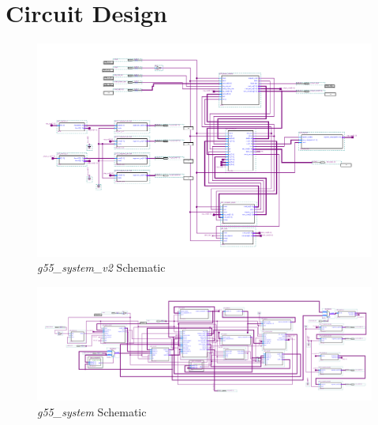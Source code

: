 \documentclass[12pt]{article}
\begin{document}
\section{Circuit Design}
\begin{figure}[H]
\centering
\includegraphics[scale = 0.45, angle=90, origin=c]{graphics/complete-circuit.png}
\caption{\textit{g55\_system\_v2} Schematic}
\end{figure}

\begin{figure}[H]
\centering
\includegraphics[scale=0.3, angle = 90, origin = c]{graphics/initial-circuit.png}
\caption{\textit{g55\_system} Schematic}
\end{figure}
\end{document}
